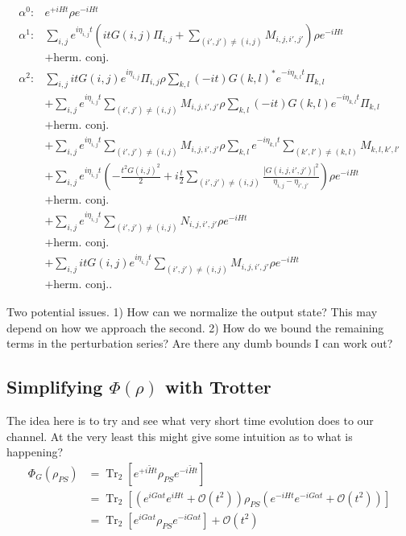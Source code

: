 \documentclass{article}
\newcommand{\parens}[1]{\left( #1 \right)}
\newcommand{\brackets}[1]{\left[ #1 \right]}
\newcommand{\abs}[1]{\left| #1 \right|}
\newcommand{\bigo}[1]{\mathcal{O}\left( #1 \right)}
\DeclareMathOperator{\Tr}{Tr}
\newcommand{\partrace}[2]{\Tr_{#1} \brackets{ #2 }}
\begin{document}
\begin{align}
\alpha^0 :& e^{+i H t} \rho e^{-i H t} \\
 \alpha^1 :& \sum_{i,j} e^{i\eta_{i,j}t} \parens{i t G(i,j) \Pi_{i,j} + \sum_{(i',j') \neq (i,j)} M_{i,j,i',j'}} \rho e^{- i H t} \\
 &+ \text{herm. conj.} \\
 \alpha^2 :& \sum_{i,j} i t G(i,j) e^{i \eta_{i,j}} \Pi_{i,j} \rho \sum_{k,l} (-i t) G(k,l)^* e^{-i \eta_{k,l}t} \Pi_{k,l} \\
 &+ \sum_{i,j} e^{i \eta_{i,j} t} \sum_{(i',j') \neq (i,j)} M_{i,j,i',j'} \rho \sum_{k,l} (-i t) G(k,l) e^{-i \eta_{k,l} t} \Pi_{k,l} \\
 &+ \text{herm. conj.} \\
 &+ \sum_{i,j} e^{i \eta_{i,j} t} \sum_{(i',j') \neq (i,j)} M_{i,j,i',j'} \rho \sum_{k,l} e^{-i \eta_{k,l} t} \sum_{(k',l') \neq (k,l)} M_{k,l,k',l'}\\
 &+  \sum_{i,j} e^{i \eta_{i,j} t} \parens{- \frac{t^2 G(i,j)^2}{2} + i \frac{t}{2} \sum_{(i',j') \neq (i,j)} \frac{\abs{G(i,j,i',j')}^2}{\eta_{i,j} - \eta_{i',j'}} } \rho e^{- i H t} \\
 &+ \text{herm. conj.} \\
 &+ \sum_{i,j} e^{i \eta_{i,j} t} \sum_{(i',j') \neq (i,j)} N_{i,j,i',j'} \rho e^{-i H t} \\
 &+ \text{herm. conj.} \\
 &+ \sum_{i,j} i t G(i,j) e^{i \eta_{i,j} t} \sum_{(i',j') \neq (i,j)} M_{i,j,i',j'} \rho e^{-i H t} \\
 &+ \text{herm. conj.}.
\end{align}

Two potential issues. 1) How can we normalize the output state? This may depend on how we approach the second. 2) How do we bound the remaining terms in the perturbation series? Are there any dumb bounds I can work out? 


\subsection{Simplifying $\Phi(\rho)$ with Trotter}
The idea here is to try and see what very short time evolution does to our channel. At the very least this might give some intuition as to what is happening?
\begin{align}
    \Phi_G(\rho_{PS}) &= \partrace{2}{e^{+i\widetilde{H}t} \rho_{PS} e^{-i \widetilde{H} t}} \\
    &= \partrace{2}{\parens{e^{i G \alpha t} e^{i H t} + \bigo{t^2}} \rho_{PS} \parens{e^{-iHt} e^{-i G \alpha t} + \bigo{t^2}}} \\
    &= \partrace{2}{e^{i G \alpha t} \rho_{PS} e^{-i G \alpha t}} + \bigo{t^2} 
\end{align}
\end{document}
